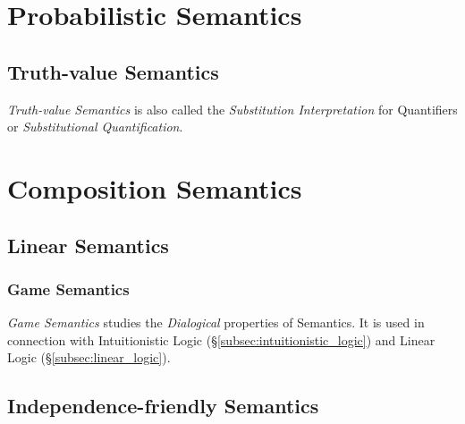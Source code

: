 \documentclass{article}
\begin{document}
\section{Probabilistic Semantics}

\subsection{Truth-value Semantics}

\emph{Truth-value Semantics} is also called the \emph{Substitution
  Interpretation} for Quantifiers or \emph{Substitutional
  Quantification}.

\section{Composition Semantics}

\subsection{Linear Semantics}

\subsubsection{Game Semantics}

\emph{Game Semantics} studies the \emph{Dialogical} properties of
Semantics. It is used in connection with Intuitionistic Logic
(\S\ref{subsec:intuitionistic_logic}) and Linear Logic
(\S\ref{subsec:linear_logic}).

\subsection{Independence-friendly Semantics}
\end{document}
